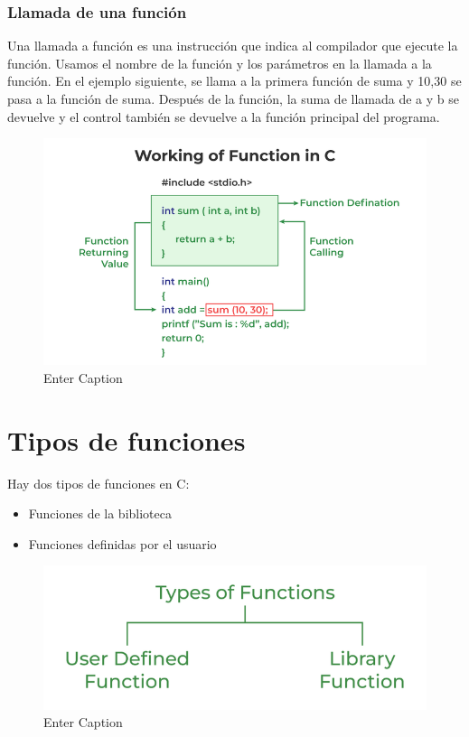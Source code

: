 \documentclass{article}
\begin{document}
\subsubsection{Llamada de una función}
Una llamada a función es una instrucción que indica al compilador que ejecute la función. Usamos el nombre de la función y los parámetros en la llamada a la función. En el ejemplo siguiente, se llama a la primera función de suma y 10,30 se pasa a la función de suma. Después de la función, la suma de llamada de a y b se devuelve y el control también se devuelve a la función principal del programa.
\begin{figure}[h]
    \centering
    \includegraphics[width=1\linewidth]{254468247-faf2807d-14dc-45dc-9d7c-c137fc717a89.png}
    \caption{Enter Caption}
    \label{fig:enter-label}
\end{figure}
\section{Tipos de funciones}
Hay dos tipos de funciones en C:
\begin{itemize}
    \item Funciones de la biblioteca
    \item Funciones definidas por el usuario
\end{itemize}
\begin{figure}[h]
    \centering
    \includegraphics[width=1\linewidth]{254468287-72e1c799-37f9-40ed-b781-809832e3ba5b.png}
    \caption{Enter Caption}
    \label{fig:enter-label}
\end{figure}
\end{document}
